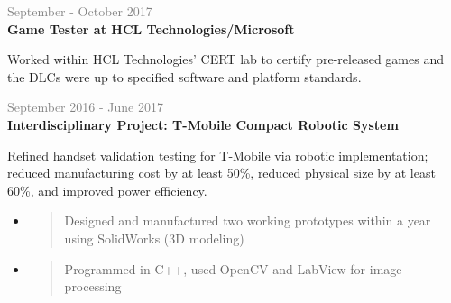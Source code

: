 \documentclass[letterpage]{article}
\begin{document}
\begin{minipage}[t]{0.63\linewidth}
\vspace{7px}
\textcolor{gray}{September - October 2017}\\
\textbf{\textsf{Game Tester at HCL Technologies/Microsoft}}\\
\raggedright
Worked within HCL Technologies' CERT lab to certify pre-released
games and the DLCs were up to specified software and platform standards.

\vspace{7px}
\textcolor{gray}{September 2016 - June 2017}\\
\textbf{\textsf{Interdisciplinary Project:
		T-Mobile Compact Robotic System}}\\
\raggedright
Refined handset validation testing for T-Mobile via robotic
implementation;\\reduced manufacturing cost by at least 50\%,
reduced physical size by at least 60\%, and improved
power efficiency.\\
\begin{itemize}[leftmargin=*,labelindent=1mm,labelsep=0mm]
\renewcommand\labelitemi{\rule[1mm]{0.33mm}{0.33mm}}
\renewcommand\labelitemii{$\blacksquare$}
\item
  \begin{quote}
  \raggedright
  Designed and manufactured two working prototypes within
  a year using SolidWorks (3D modeling)
  \end{quote}
\begin{comment}
\item
  \begin{quote}
  \raggedright
  Processed data points gathered from single taps generated
  by the first prototype using MATLAB to generate margin of position
  error and to observe how much force is applied to device screen
  \end{quote}
\item
  \begin{quote}
  \raggedright
  Used MATLAB to generate the z-axis actuator positional feedback
  from thousands of data points
  \end{quote}
\item
  \begin{quote}
  \raggedright
  Used OpenCV to detect a signifier on the phone's GUI in order
  to ensure a certain test case is successfully passed
  \end{quote}
\end{comment}
\item
  \begin{quote}
  \raggedright
  Programmed in C++,
  used OpenCV and LabView for image processing
  \end{quote}
\end{itemize}


\end{minipage}
\end{document}
